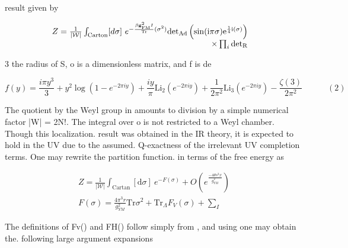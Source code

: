 \documentclass{article}
\begin{document}
\sloppy

result given by


\begin{equation}
\begin{array} { r l } { Z = \frac { 1 } { | \mathcal { W } | } \int _ { \mathrm { C a r t o n } } [ d \sigma ] ~ e ^ { - \frac { \beta \mathbf { g } _ { \mathrm { F M } } ^ { 2 } I } { \mathrm { T r } } ( \sigma ^ { 2 } ) } \mathrm { d e t } _ { \mathrm { A d } } \left ( \sin ( \mathrm { i } \pi \sigma ) \mathrm { e } ^ { \frac { 1 } { 4 } \mathrm { i } ( \sigma ) } \right ) } & { } \\ { \times \prod _ { i } \mathrm { d e t } _ { \mathrm { R}}}\end{array}
\end{equation}


3 the radius of S, o is a dimensionless matrix, and f is de


\begin{equation}
f ( y ) = { \frac { i \pi y ^ { 3 } } { 3 } } + y ^ { 2 } \log \left ( 1 - e ^ { - 2 \pi i y } \right ) + { \frac { i y } { \pi } } \mathrm { L i } _ { 2 } \left ( e ^ { - 2 \pi i y } \right ) + { \frac { 1 } { 2 \pi ^ { 2 } } } \mathrm { L i } _ { 3 } \left ( e ^ { - 2 \pi i y } \right ) - { \frac { \zeta ( 3 ) } { 2 \pi ^ { 2 } } } \qquad \quad ( 2 )
\end{equation}


The quotient by the Weyl group in amounts to division by a simple numerical factor |W| =
2N!. The integral over o is not restricted to a Weyl chamber. Though this localization.
result was obtained in the IR theory, it is expected to hold in the UV due to the assumed.
Q-exactness of the irrelevant UV completion terms. One may rewrite the partition function.
in terms of the free energy as


\begin{equation}
\begin{array} { c } { Z = \frac { 1 } { | \mathcal { W } | } \int _ { \mathrm { C a r t a n } } [ \mathrm { d } \sigma ] ~ e ^ { - F ( \sigma ) } + O \left ( e ^ { \frac { - 4 \theta s ^ { 3 } x } { g _ { Y M } ^ { 2 } } } \right ) } \\ { F ( \sigma ) = \frac { 4 \pi ^ { 3 } r } { g _ { Y M } ^ { 2 } } \mathrm { T r } \sigma ^ { 2 } + \mathrm { T r } _ { \Lambda } F _ { V } ( \sigma ) + \sum _ { I } \mathrm {}}\end{array}
\end{equation}


The definitions of Fv() and FH() follow simply from , and using one may obtain the.
following large argument expansions
\end{document}

